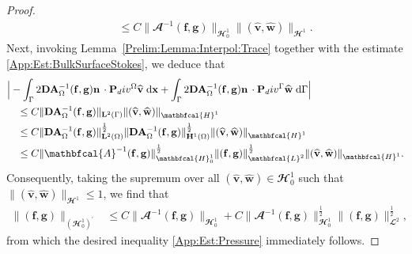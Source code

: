 \documentclass[10pt,a4paper]{amsart}
\newcommand{\A}{\mathbf{A}}
\newcommand{\Bigabs}[1]{\Big| #1 \Big|}
\newcommand{\Div}{\textnormal{div}}
\newcommand{\D}{\mathbf{D}}
\newcommand{\Ga}{\Gamma}
\newcommand{\Om}{\Omega}
\newcommand{\bv}{\mathbf{v}}
\newcommand{\bw}{\mathbf{w}}
\newcommand{\dG}{\;\mathrm d\Ga}
\newcommand{\dx}{\;\mathrm d\mathbf{x}}
\newcommand{\f}{\mathbf{f}}
\newcommand{\g}{\mathbf{g}}
\newcommand{\intG}{\int_\Gamma}
\newcommand{\norm}[1]{\| #1 \|}
\newcommand{\n}{\mathbf{n}}
\newcommand{\wv}{\widehat{\bv}}
\newcommand{\ww}{\widehat{\bw}}
\begin{document}
\begin{proof}
\begin{align*}
        &\quad\leq C\norm{\mathbfcal{A}^{-1}(\f,\g)}_{\mathbfcal{H}^1_{0}}\norm{(\wv,\ww)}_{\mathbfcal{H}^1}.
    \end{align*}
    Next, invoking Lemma~\ref{Prelim:Lemma:Interpol:Trace} together with the estimate \eqref{App:Est:BulkSurfaceStokes}, we deduce that
    \begin{align*}
        &\Bigabs{- \intG 2\D\A_\Om^{-1}(\f,\g)\n\,\cdot\mathbf{P}_\Div^\Om\wv\dx + \intG 2\D\A_\Om^{-1}(\f,\g)\n\,\cdot\mathbf{P}_\Div^\Ga\ww\dG} \\
        &\quad\leq C\norm{\D\A_\Om^{-1}(\f,\g)}_{\mathbf{L}^2(\Ga)}\norm{(\wv,\ww)}_{\mathbfcal{H}^1} \\
        &\quad\leq C\norm{\D\A_\Om^{-1}(\f,\g)}_{\mathbf{L}^2(\Om)}^{\frac12}\norm{\D\A_\Om^{-1}(\f,\g)}_{\mathbf{H}^1(\Om)}^{\frac12}\norm{(\wv,\ww)}_{\mathbfcal{H}^1} \\
        &\quad\leq C\norm{\mathbfcal{A}^{-1}(\f,\g)}_{\mathbfcal{H}^1_{0}}^{\frac12}\norm{(\f,\g)}_{\mathbfcal{L}^2}^{\frac12}\norm{(\wv,\ww)}_{\mathbfcal{H}^1}.
    \end{align*}
    Consequently, taking the supremum over all $(\wv,\ww)\in\mathbfcal{H}^1_0$ such that $\norm{(\wv,\ww)}_{\mathbfcal{H}^1} \leq 1$, we find that
    \begin{align*}
        \norm{(\f,\g)}_{(\mathbfcal{H}^1_0)^\prime} &\leq C\norm{\mathbfcal{A}^{-1}(\f,\g)}_{\mathbfcal{H}^1_{0}} + C\norm{\mathbfcal{A}^{-1}(\f,\g)}_{\mathbfcal{H}^1_0}^{\frac12}\norm{(\f,\g)}_{\mathbfcal{L}^2}^{\frac12},
    \end{align*}
    from which the desired inequality \eqref{App:Est:Pressure} immediately follows.
\end{proof}
\end{document}
